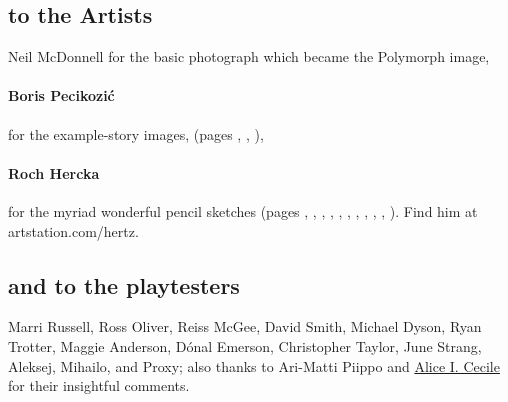 \begin{multicols}{2}

\subsection*{to the Artists}

Neil McDonnell for the basic photograph which became the Polymorph image,

\paragraph{Boris Pecikozi\'c} for the example-story images, (pages 
\pageref{boris:jump}, 
\pageref{boris:brawl}, 
\pageref{boris:meet}), 


\paragraph{Roch Hercka} for the myriad wonderful pencil sketches (pages 
\pageref{roch:races}, 
\pageref{roch:dwarf}, 
\pageref{roch:stances}, 
\pageref{roch:vitals}, 
\pageref{roch:xp1}, 
\pageref{roch:xp2}, 
\pageref{roch:enchanter}, 
\pageref{roch:polymorph}, 
\pageref{roch:runes}, 
\pageref{roch:trogdor}, 
\pageref{roch:light}
).
Find him at artstation.com/hertz.

\subsection*{and to the playtesters} Marri Russell, Ross Oliver, Reiss McGee, David Smith, Michael Dyson, Ryan Trotter, Maggie Anderson, 
D\'{o}nal Emerson, Christopher Taylor, June Strang, 
Aleksej, Mihailo, and Proxy;
also thanks to Ari-Matti Piippo and \href{https://www.twitter.com/AliceICecile}{Alice I. Cecile} for their insightful comments.

\end{multicols}

